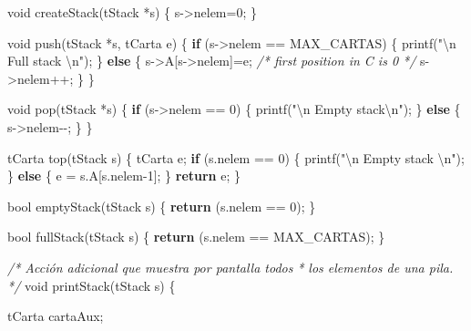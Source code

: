 \documentclass[
]{book}
\newenvironment{Shaded}{\begin{snugshade}}{\end{snugshade}}
\newcommand{\CommentTok}[1]{\textcolor[rgb]{0.56,0.35,0.01}{\textit{#1}}}
\newcommand{\ControlFlowTok}[1]{\textcolor[rgb]{0.13,0.29,0.53}{\textbf{#1}}}
\newcommand{\DataTypeTok}[1]{\textcolor[rgb]{0.13,0.29,0.53}{#1}}
\newcommand{\DecValTok}[1]{\textcolor[rgb]{0.00,0.00,0.81}{#1}}
\newcommand{\NormalTok}[1]{#1}
\newcommand{\SpecialCharTok}[1]{\textcolor[rgb]{0.00,0.00,0.00}{#1}}
\newcommand{\StringTok}[1]{\textcolor[rgb]{0.31,0.60,0.02}{#1}}
\begin{document}
\begin{Shaded}
\begin{Highlighting}[]
\DataTypeTok{void}\NormalTok{ createStack(tStack *s) \{}
\NormalTok{    s{-}\textgreater{}nelem=}\DecValTok{0}\NormalTok{;}
\NormalTok{\}}

\DataTypeTok{void}\NormalTok{ push(tStack *s, tCarta e) \{}
    \ControlFlowTok{if}\NormalTok{ (s{-}\textgreater{}nelem == MAX\_CARTAS) \{}
\NormalTok{        printf(}\StringTok{"}\SpecialCharTok{\textbackslash{}n}\StringTok{ Full stack }\SpecialCharTok{\textbackslash{}n}\StringTok{"}\NormalTok{);}
\NormalTok{    \} }\ControlFlowTok{else}\NormalTok{ \{}
\NormalTok{        s{-}\textgreater{}A[s{-}\textgreater{}nelem]=e; }\CommentTok{/* first position in C is 0 */}
\NormalTok{        s{-}\textgreater{}nelem++;}
\NormalTok{    \}}
\NormalTok{\}}

\DataTypeTok{void}\NormalTok{ pop(tStack *s) \{}
    \ControlFlowTok{if}\NormalTok{ (s{-}\textgreater{}nelem == }\DecValTok{0}\NormalTok{) \{}
\NormalTok{        printf(}\StringTok{"}\SpecialCharTok{\textbackslash{}n}\StringTok{ Empty stack}\SpecialCharTok{\textbackslash{}n}\StringTok{"}\NormalTok{);}
\NormalTok{    \} }\ControlFlowTok{else}\NormalTok{ \{}
\NormalTok{        s{-}\textgreater{}nelem{-}{-};}
\NormalTok{    \}}
\NormalTok{\}}

\NormalTok{tCarta top(tStack s) \{}
\NormalTok{    tCarta e;}
    \ControlFlowTok{if}\NormalTok{ (s.nelem == }\DecValTok{0}\NormalTok{) \{}
\NormalTok{        printf(}\StringTok{"}\SpecialCharTok{\textbackslash{}n}\StringTok{ Empty stack }\SpecialCharTok{\textbackslash{}n}\StringTok{"}\NormalTok{);}
\NormalTok{    \} }\ControlFlowTok{else}\NormalTok{ \{}
\NormalTok{        e = s.A[s.nelem{-}}\DecValTok{1}\NormalTok{];}
\NormalTok{    \}}
    \ControlFlowTok{return}\NormalTok{ e;}
\NormalTok{\}}

\DataTypeTok{bool}\NormalTok{ emptyStack(tStack s) \{}
    \ControlFlowTok{return}\NormalTok{ (s.nelem == }\DecValTok{0}\NormalTok{);}
\NormalTok{\}}

\DataTypeTok{bool}\NormalTok{ fullStack(tStack s) \{}
    \ControlFlowTok{return}\NormalTok{ (s.nelem == MAX\_CARTAS);}
\NormalTok{\}}

\CommentTok{/* Acción adicional que muestra por pantalla todos }
\CommentTok{ * los elementos de una pila. }
\CommentTok{ */}
\DataTypeTok{void}\NormalTok{ printStack(tStack s) \{}
    
\NormalTok{    tCarta cartaAux;}
    

\end{Highlighting}
\end{Shaded}
\end{document}
